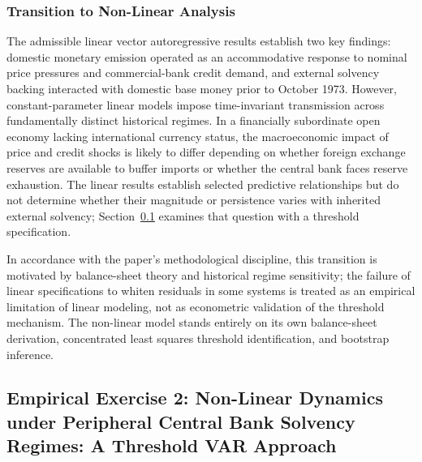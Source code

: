 \subsubsection{Transition to Non-Linear Analysis}
\label{sec:granger_transition}
\label{sec:granger_discussion}

The admissible linear vector autoregressive results establish two key findings: domestic monetary emission operated as an accommodative response to nominal price pressures and commercial-bank credit demand, and external solvency backing interacted with domestic base money prior to October 1973. However, constant-parameter linear models impose time-invariant transmission across fundamentally distinct historical regimes. In a financially subordinate open economy lacking international currency status, the macroeconomic impact of price and credit shocks is likely to differ depending on whether foreign exchange reserves are available to buffer imports or whether the central bank faces reserve exhaustion. The linear results establish selected predictive relationships but do not determine whether their magnitude or persistence varies with inherited external solvency; Section~\ref{sec:tvar_solvency_regimes} examines that question with a threshold specification.

In accordance with the paper's methodological discipline, this transition is motivated by balance-sheet theory and historical regime sensitivity; the failure of linear specifications to whiten residuals in some systems is treated as an empirical limitation of linear modeling, not as econometric validation of the threshold mechanism. The non-linear model stands entirely on its own balance-sheet derivation, concentrated least squares threshold identification, and bootstrap inference.



\subsection{Empirical Exercise 2: Non-Linear Dynamics under Peripheral Central Bank Solvency Regimes: A Threshold VAR Approach}
\label{sec:tvar_solvency_regimes}


